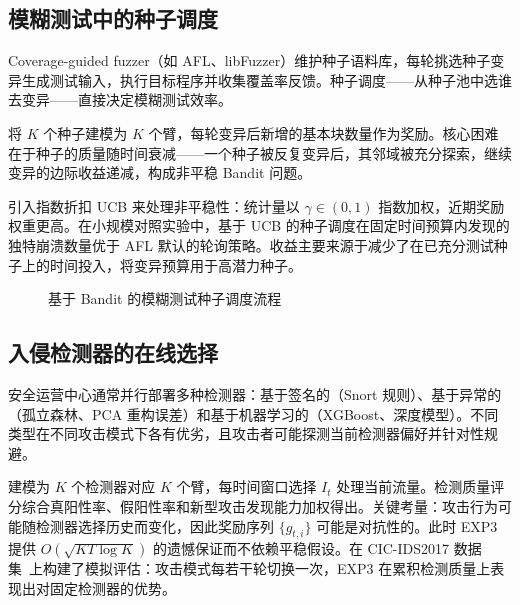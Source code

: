 \documentclass[UTF8,a4paper,11pt,zihao=5]{ctexart}
\newcommand{\argmax}{\mathop{\arg\max}}
\begin{document}
\subsection{模糊测试中的种子调度}

Coverage-guided fuzzer（如 AFL、libFuzzer）维护种子语料库，每轮挑选种子变异生成测试输入，执行目标程序并收集覆盖率反馈。种子调度——从种子池中选谁去变异——直接决定模糊测试效率。

将 $K$ 个种子建模为 $K$ 个臂，每轮变异后新增的基本块数量作为奖励。核心困难在于种子的质量随时间衰减——一个种子被反复变异后，其邻域被充分探索，继续变异的边际收益递减，构成非平稳 Bandit 问题。

引入指数折扣 UCB 来处理非平稳性：统计量以 $\gamma \in (0,1)$ 指数加权，近期奖励权重更高。在小规模对照实验中，基于 UCB 的种子调度在固定时间预算内发现的独特崩溃数量优于 AFL 默认的轮询策略。收益主要来源于减少了在已充分测试种子上的时间投入，将变异预算用于高潜力种子。

\begin{figure}[htbp]
\centering
{}
\caption{基于 Bandit 的模糊测试种子调度流程}
\label{fig:fuzz}
\end{figure}

\subsection{入侵检测器的在线选择}

安全运营中心通常并行部署多种检测器：基于签名的（Snort 规则）、基于异常的（孤立森林、PCA 重构误差）和基于机器学习的（XGBoost、深度模型）。不同类型在不同攻击模式下各有优劣，且攻击者可能探测当前检测器偏好并针对性规避。

建模为 $K$ 个检测器对应 $K$ 个臂，每时间窗口选择 $I_t$ 处理当前流量。检测质量评分综合真阳性率、假阳性率和新型攻击发现能力加权得出。关键考量：攻击行为可能随检测器选择历史而变化，因此奖励序列 $\{g_{t,i}\}$ 可能是对抗性的。此时 EXP3 提供 $O(\sqrt{KT\log K})$ 的遗憾保证而不依赖平稳假设。在 CIC-IDS2017 数据集~\cite{sharafaldin2018}上构建了模拟评估：攻击模式每若干轮切换一次，EXP3 在累积检测质量上表现出对固定检测器的优势。
\end{document}
